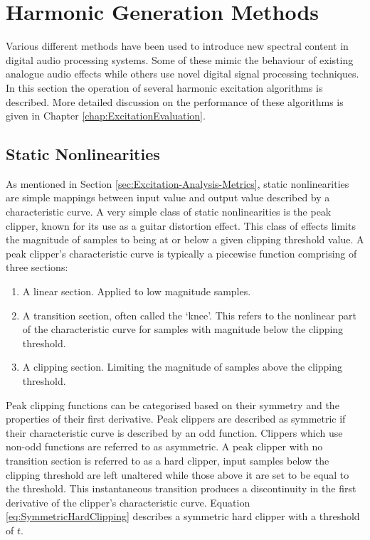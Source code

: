 \section{Harmonic Generation Methods}
\label{sec:Excitation-Methods}
	Various different methods have been used to introduce new spectral content in digital audio processing systems. Some
	of these mimic the behaviour of existing analogue audio effects while others use novel digital signal processing
	techniques. In this section the operation of several harmonic excitation algorithms is described. More detailed
	discussion on the performance of these algorithms is given in Chapter \ref{chap:ExcitationEvaluation}.

	\subsection{Static Nonlinearities}
	\label{sec:Excitation-Methods-Statics}
		As mentioned in Section \ref{sec:Excitation-Analysis-Metrics}, static nonlinearities are simple mappings
		between input value and output value described by a characteristic curve. A very simple class of static
		nonlinearities is the peak clipper, known for its use as a guitar distortion effect. This class of effects
		limits the magnitude of samples to being at or below a given clipping threshold value. A peak clipper's
		characteristic curve is typically a piecewise function comprising of three sections:

		\begin{enumerate}
			\item A linear section. Applied to low magnitude samples.
			\item A transition section, often called the `knee'. This refers to the nonlinear part of the
				characteristic curve for samples with magnitude below the clipping threshold.
			\item A clipping section. Limiting the magnitude of samples above the clipping threshold.
		\end{enumerate}
		
		Peak clipping functions can be categorised based on their symmetry and the properties of their first
		derivative. Peak clippers are described as symmetric if their characteristic curve is described by an odd
		function. Clippers which use non-odd functions are referred to as asymmetric. A peak clipper with no
		transition section is referred to as a hard clipper, input samples below the clipping threshold are left
		unaltered while those above it are set to be equal to the threshold. This instantaneous transition produces
		a discontinuity in the first derivative of the clipper's characteristic curve. Equation
		\ref{eq:SymmetricHardClipping} describes a symmetric hard clipper with a threshold of $t$.

